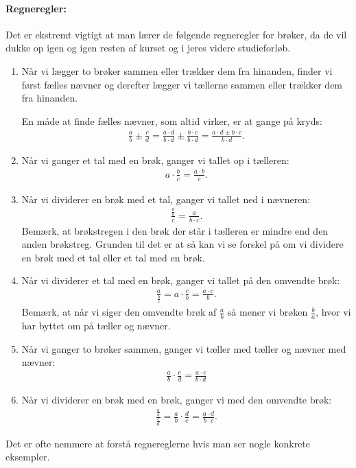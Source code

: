 \paragraph*{Regneregler:}
Det er ekstremt vigtigt at man lærer de følgende regneregler for brøker, da de vil dukke op igen og igen resten af kurset og i jeres videre studieforløb.
\begin{enumerate}
\item Når vi lægger to brøker sammen eller trækker dem fra hinanden, finder vi først fælles nævner og derefter lægger vi tællerne sammen eller trækker dem fra hinanden. 

En måde at finde fælles nævner, som altid virker, er at gange på kryds:
\begin{align*}
\frac{a}{b}\pm \frac{c}{d}= \frac{a \cdot d}{b \cdot d} \pm \frac{b \cdot c}{b \cdot d} = \frac{a \cdot d \pm b \cdot c}{b \cdot d}.
\end{align*}
\item Når vi ganger et tal med en brøk, ganger vi tallet op i tælleren:
\begin{align*}
a \cdot \frac{b}{c}=\frac{a \cdot b}{c}.
\end{align*}
\item Når vi dividerer en brøk med et tal, ganger vi tallet ned i nævneren:
\begin{align*}
\frac{\frac{a}{b}}{c}=\frac{a}{b\cdot c}.
\end{align*}
Bemærk, at brøkstregen i den brøk der står i tælleren er mindre end den anden brøkstreg. Grunden til det er at så kan vi se forskel på om vi dividere en brøk med et tal eller et tal med en brøk. 
\item Når vi dividerer et tal med en brøk, ganger vi tallet på den omvendte brøk:
\begin{align*}
\frac{a}{\frac{b}{c}}= a \cdot \frac{c}{b} = \frac{a \cdot c}{b}.
\end{align*}
Bemærk, at når vi siger den omvendte brøk af $\frac{a}{b}$ så mener vi brøken $\frac{b}{a}$, hvor vi har byttet om på tæller og nævner.
\item Når vi ganger to brøker sammen, ganger vi tæller med tæller og nævner med nævner:
\begin{align*}
\frac{a}{b} \cdot \frac{c}{d} = \frac{a \cdot c}{b \cdot d}
\end{align*}
\item Når vi dividerer en brøk med en brøk, ganger vi med den omvendte brøk:
\begin{align*}
\frac{\frac{a}{b}}{\frac{c}{d}} = \frac{a}{b} \cdot \frac{d}{c} = \frac{a \cdot d}{b \cdot c}.
\end{align*}
\end{enumerate}
Det er ofte nemmere at forstå regnereglerne hvis man ser nogle konkrete eksempler.
